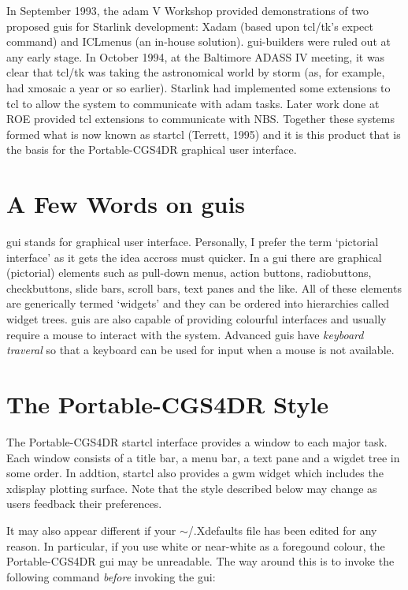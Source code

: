 \documentclass[a4paper]{book}
\renewcommand{\_}{{\tt\char'137}}
\begin{document}
In September 1993, the {\sc adam} V Workshop provided demonstrations of two
proposed {\sc gui}s for Starlink development: Xadam (based upon tcl/tk's expect
command) and ICLmenus (an in-house solution). {\sc gui}-builders were ruled out
at any early stage. In October 1994, at the Baltimore ADASS IV meeting, it
was clear that tcl/tk was taking the astronomical world by storm (as, for
example, had xmosaic a year or so earlier). Starlink had implemented some
extensions to tcl to allow the system to communicate with {\sc adam} tasks.
Later work done at ROE provided tcl extensions to communicate with NBS.
Together these systems formed what is now known as {\sc startcl} (Terrett, 1995)
and it is this product that is the basis for the Portable-CGS4DR graphical
user interface. 

\section{A Few Words on {\sc gui}s}
{\sc gui} stands for graphical user interface. Personally, I prefer the term
`pictorial interface' as it gets the idea accross must quicker. In a {\sc gui}
there are graphical (pictorial) elements such as pull-down menus, action
buttons, radiobuttons, checkbuttons, slide bars, scroll bars, text panes
and the like. All of these elements are generically termed `widgets' and
they can be ordered into hierarchies called widget trees. {\sc gui}s are also
capable of providing colourful interfaces and usually require a mouse to
interact with the system. Advanced {\sc gui}s have {\em keyboard traveral} so
that a keyboard can be used for input when a mouse is not available. 

\section{The Portable-CGS4DR Style}
The Portable-CGS4DR {\sc startcl} interface provides a window to each major
task. Each window consists of a title bar, a menu bar, a text pane and a
wigdet tree in some order. In addtion, {\sc startcl} also provides a {\sc gwm} widget
which includes the xdisplay plotting surface. Note that the style described
below may change as users feedback their preferences. 

It may also appear different if your $\sim$/.Xdefaults file has been edited for any reason.
In particular, if you use white or near-white as a foregound colour, the Portable-CGS4DR
{\sc gui} may be unreadable. The way around this is to invoke the following command
{\em before} invoking the {\sc gui}:
\end{document}
